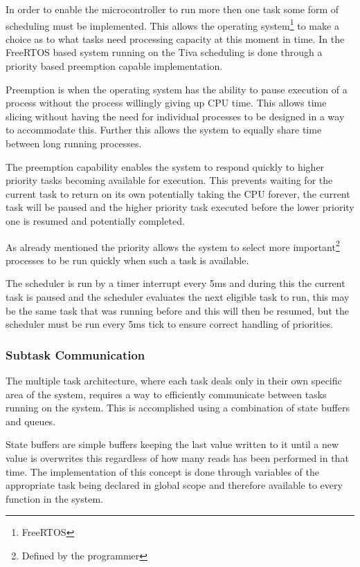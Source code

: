 \documentclass[../../../main]{subfiles}
\begin{document}
In order to enable the microcontroller to run more then one task some form of scheduling must be implemented. This allows the operating system\footnote{FreeRTOS} to make a choice as to what tasks need processing capacity at this moment in time. In the FreeRTOS based system running on the Tiva scheduling is done through a priority based preemption capable implementation.

Preemption is when the operating system has the ability to pause execution of a process without the process willingly giving up CPU time. This allows time slicing without having the need for individual processes to be designed in a way to accommodate this. Further this allows the system to equally share time between long running processes.

The preemption capability enables the system to respond quickly to higher priority tasks becoming available for execution. This prevents waiting for the current task to return on its own potentially taking the CPU forever, the current task  will be paused and the higher priority task executed before the lower priority one is resumed and potentially completed.

As already mentioned the priority allows the system to select more important\footnote{Defined by the programmer} processes to be run quickly when such a task is available. 

The scheduler is run by a timer interrupt every 5ms and during this the current task is paused and the scheduler evaluates the next eligible task to run, this may be the same task that was running before and this will then be resumed, but the scheduler must be run every 5ms tick to ensure correct handling of priorities.

\subsubsection{Subtask Communication}

The multiple task architecture, where each task deals only in their own specific area of the system, requires a way to efficiently communicate between tasks running on the system.    
This is accomplished using a combination of state buffers and queues.

State buffers are simple buffers keeping the last value written to it until a new value is overwrites this regardless of how many reads has been performed in that time. The implementation of this concept is done through variables of the appropriate task being declared in global scope and therefore available to every function in the system.
\end{document}
